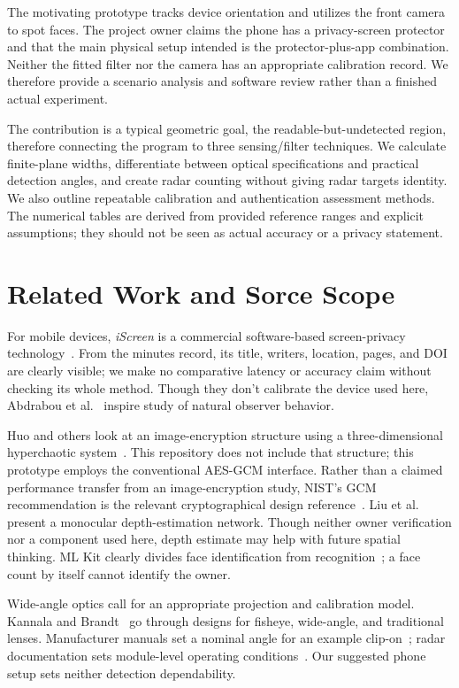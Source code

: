 \documentclass[conference]{IEEEtran}
\begin{document}
The motivating prototype tracks device orientation and utilizes the front camera to spot faces. The project owner claims the phone has a privacy-screen protector and that the main physical setup intended is the protector-plus-app combination. Neither the fitted filter nor the camera has an appropriate calibration record. We therefore provide a scenario analysis and software review rather than a finished actual experiment.

The contribution is a typical geometric goal, the readable-but-undetected region, therefore connecting the program to three sensing/filter techniques. We calculate finite-plane widths, differentiate between optical specifications and practical detection angles, and create radar counting without giving radar targets identity. We also outline repeatable calibration and authentication assessment methods. The numerical tables are derived from provided reference ranges and explicit assumptions; they should not be seen as actual accuracy or a privacy statement.

\section{Related Work and Sorce Scope}
For mobile devices, \emph{iScreen} is a commercial software-based screen-privacy technology~\cite{Lei2021iScreen}. From the minutes record, its title, writers, location, pages, and DOI are clearly visible; we make no comparative latency or accuracy claim without checking its whole method. Though they don't calibrate the device used here, Abdrabou et al.~\cite{Abdrabou2025Shoulder} inspire study of natural observer behavior.

Huo and others look at an image-encryption structure using a three-dimensional hyperchaotic system~\cite{Huo2025AES}. This repository does not include that structure; this prototype employs the conventional AES-GCM interface. Rather than a claimed performance transfer from an image-encryption study, NIST's GCM recommendation is the relevant cryptographical design reference~\cite{NISTGCM}. Liu et al.~\cite{Liu2025Monocular} present a monocular depth-estimation network. Though neither owner verification nor a component used here, depth estimate may help with future spatial thinking. ML Kit clearly divides face identification from recognition~\cite{MLKit}; a face count by itself cannot identify the owner.

Wide-angle optics call for an appropriate projection and calibration model. Kannala and Brandt~\cite{Kannala2006} go through designs for fisheye, wide-angle, and traditional lenses. Manufacturer manuals set a nominal angle for an example clip-on~\cite{Kenko}; radar documentation sets module-level operating conditions~\cite{LD2450,LDProtocol}. Our suggested phone setup sets neither detection dependability.
\end{document}
